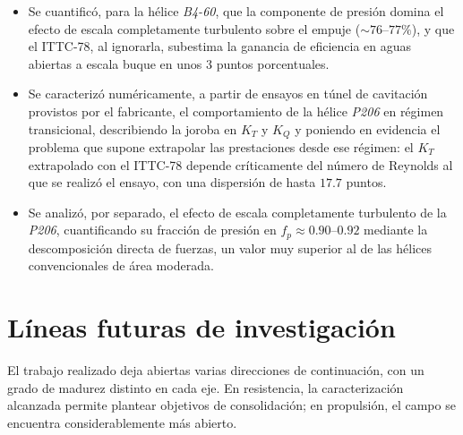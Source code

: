 \begin{itemize}
    \item Se cuantificó, para la hélice \textit{B4-60}, que la componente de presión domina el
    efecto de escala completamente turbulento sobre el empuje ($\sim 76$--$77\%$), y
    que el ITTC-78, al ignorarla, subestima la ganancia de eficiencia en aguas abiertas
    a escala buque en unos $3$ puntos porcentuales.

    \item Se caracterizó numéricamente, a partir de ensayos en túnel de cavitación
    provistos por el fabricante, el comportamiento de la hélice \textit{P206} en régimen
    transicional, describiendo la joroba en $K_T$ y $K_Q$ y poniendo en evidencia el
    problema que supone extrapolar las prestaciones desde ese régimen: el $K_T$
    extrapolado con el ITTC-78 depende críticamente del número de Reynolds al que se
    realizó el ensayo, con una dispersión de hasta $17{.}7$ puntos.

    \item Se analizó, por separado, el efecto de escala completamente turbulento de la
    \textit{P206}, cuantificando su fracción de presión en $f_p \approx 0{.}90$--$0{.}92$
    mediante la descomposición directa de fuerzas, un valor muy superior al de las
    hélices convencionales de área moderada.
\end{itemize}

\section{Líneas futuras de investigación}

El trabajo realizado deja abiertas varias direcciones de continuación, con un grado
de madurez distinto en cada eje. En resistencia, la caracterización alcanzada permite
plantear objetivos de consolidación; en propulsión, el campo se encuentra
considerablemente más abierto.

